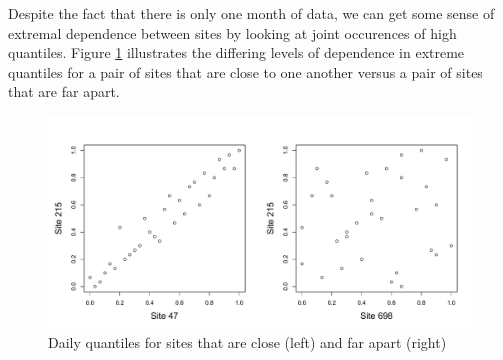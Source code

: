 \documentclass[11pt]{article}
\begin{document}
Despite the fact that there is only one month of data, we can get some sense of extremal dependence between sites by looking at joint occurences of high quantiles.
Figure \ref{fig:bivariateozone} illustrates the differing levels of dependence in extreme quantiles for a pair of sites that are close to one another versus a pair of sites that are far apart.
\begin{figure}
  \label{fig:bivariateozone}
  \centering
  \includegraphics[width=\linewidth]{plots/daily-quantiles-ozone.pdf}
  \caption{Daily quantiles for sites that are close (left) and far apart (right)}
\end{figure}



\end{document}
